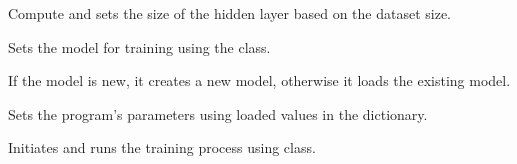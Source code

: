 \documentclass[letterpaper,10pt,english]{sphinxmanual}
\begin{document}
\begin{fulllineitems}
\begin{fulllineitems}
\end{fulllineitems}


\begin{fulllineitems}
\label{\detokenize{MainProgram:MainProgram.MainProgram.set_hidden_size}}
\pysigstartsignatures
{}
\pysigstopsignatures
\sphinxAtStartPar
Compute and sets the size of the hidden layer based on the dataset size.

\end{fulllineitems}


\begin{fulllineitems}
\label{\detokenize{MainProgram:MainProgram.MainProgram.set_model}}
\pysigstartsignatures
{}
\pysigstopsignatures
\sphinxAtStartPar
Sets the model for training using the  class.
\begin{description}
\sphinxAtStartPar
If the model is new, it creates a new model, otherwise it loads the existing model.

\end{description}

\end{fulllineitems}


\begin{fulllineitems}
\label{\detokenize{MainProgram:MainProgram.MainProgram.set_parameters}}
\pysigstartsignatures
{}
\pysigstopsignatures
\sphinxAtStartPar
Sets the program’s parameters using loaded values in the  dictionary.

\end{fulllineitems}


\begin{fulllineitems}
\label{\detokenize{MainProgram:MainProgram.MainProgram.train}}
\pysigstartsignatures
{}
\pysigstopsignatures
\sphinxAtStartPar
Initiates and runs the training process using  class.


\end{fulllineitems}
\end{fulllineitems}
\end{document}

